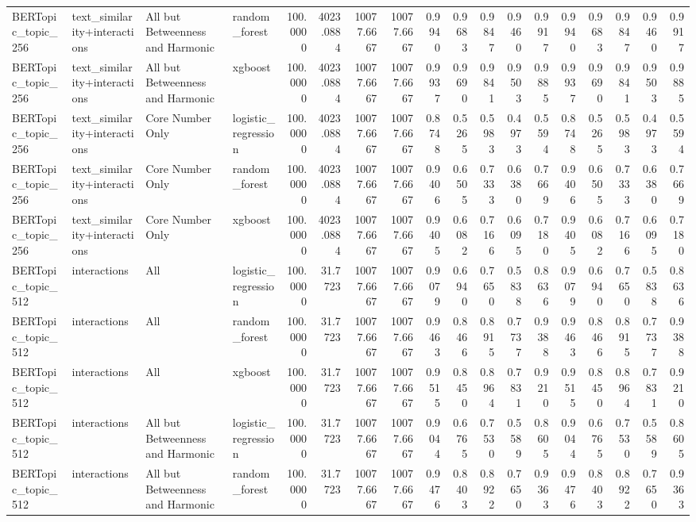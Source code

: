 \begin{tabular}{llllrrrrrrrrrrrrrr}
BERTopic_topic_256 & text_similarity+interactions & All but Betweenness and Harmonic & random_forest & 100.0000 & 4023.0884 & 10077.6667 & 10077.6667 & 0.9940 & 0.9683 & 0.9847 & 0.9460 & 0.9917 & 0.9940 & 0.9683 & 0.9847 & 0.9460 & 0.9917 \\
BERTopic_topic_256 & text_similarity+interactions & All but Betweenness and Harmonic & xgboost & 100.0000 & 4023.0884 & 10077.6667 & 10077.6667 & 0.9937 & 0.9690 & 0.9841 & 0.9503 & 0.9885 & 0.9937 & 0.9690 & 0.9841 & 0.9503 & 0.9885 \\
BERTopic_topic_256 & text_similarity+interactions & Core Number Only & logistic_regression & 100.0000 & 4023.0884 & 10077.6667 & 10077.6667 & 0.8748 & 0.5265 & 0.5983 & 0.4973 & 0.5594 & 0.8748 & 0.5265 & 0.5983 & 0.4973 & 0.5594 \\
BERTopic_topic_256 & text_similarity+interactions & Core Number Only & random_forest & 100.0000 & 4023.0884 & 10077.6667 & 10077.6667 & 0.9406 & 0.6505 & 0.7333 & 0.6380 & 0.7669 & 0.9406 & 0.6505 & 0.7333 & 0.6380 & 0.7669 \\
BERTopic_topic_256 & text_similarity+interactions & Core Number Only & xgboost & 100.0000 & 4023.0884 & 10077.6667 & 10077.6667 & 0.9405 & 0.6082 & 0.7166 & 0.6095 & 0.7180 & 0.9405 & 0.6082 & 0.7166 & 0.6095 & 0.7180 \\
BERTopic_topic_512 & interactions & All & logistic_regression & 100.0000 & 31.7723 & 10077.6667 & 10077.6667 & 0.9079 & 0.6940 & 0.7650 & 0.5838 & 0.8636 & 0.9079 & 0.6940 & 0.7650 & 0.5838 & 0.8636 \\
BERTopic_topic_512 & interactions & All & random_forest & 100.0000 & 31.7723 & 10077.6667 & 10077.6667 & 0.9463 & 0.8466 & 0.8915 & 0.7737 & 0.9388 & 0.9463 & 0.8466 & 0.8915 & 0.7737 & 0.9388 \\
BERTopic_topic_512 & interactions & All & xgboost & 100.0000 & 31.7723 & 10077.6667 & 10077.6667 & 0.9515 & 0.8450 & 0.8964 & 0.7831 & 0.9210 & 0.9515 & 0.8450 & 0.8964 & 0.7831 & 0.9210 \\
BERTopic_topic_512 & interactions & All but Betweenness and Harmonic & logistic_regression & 100.0000 & 31.7723 & 10077.6667 & 10077.6667 & 0.9044 & 0.6765 & 0.7530 & 0.5589 & 0.8605 & 0.9044 & 0.6765 & 0.7530 & 0.5589 & 0.8605 \\
BERTopic_topic_512 & interactions & All but Betweenness and Harmonic & random_forest & 100.0000 & 31.7723 & 10077.6667 & 10077.6667 & 0.9476 & 0.8403 & 0.8922 & 0.7650 & 0.9363 & 0.9476 & 0.8403 & 0.8922 & 0.7650 & 0.9363 \\

\end{tabular}
